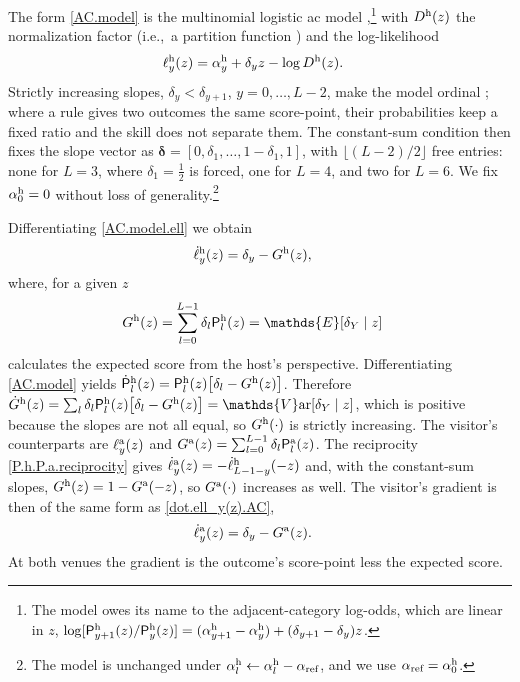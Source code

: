 \documentclass[letterpaper,12pt]{article}
\newcommand{\tr}[1]{\textrm{#1}}
\newcommand{\tnr}[1]{{\textnormal{#1}}}
\newcommand{\mf}[1]{\mathsf{#1}}
\newcommand{\ms}[1]{\mathds{#1}}
\newcommand{\bdelta}{\boldsymbol{\delta}}
\newcommand{\ie}{i.e.,~} 		%
\newcommand{\cd}{\cdot}
\newcommand{\ld}{\ldots}
\newcommand{\Ex}{\ms{E}}     			%
\newcommand{\Var}{\ms{V}\tr{ar}}     			%
\newcommand{\mfP}{\mf{P}}
\begin{document}
The form \eqref{AC.model} is the multinomial logistic \gls{ac} model \citep{Bock72,Tutz20,Egidi21,Szczecinski22},\footnote{The model owes its name to the adjacent-category log-odds, which are linear in $z$, $\log[\mfP^\tnr{h}_{y+1}(z)/\mfP^\tnr{h}_y(z)]=(\alpha^\tnr{h}_{y+1}-\alpha^\tnr{h}_y)+(\delta_{y+1}-\delta_y)z$.} with $D^\tnr{h}(z)$ the normalization factor (\ie a partition function \citep[Sec.~4.2]{Barber12_Book}) and the log-likelihood
\begin{align}
\label{AC.model.ell}
\ell^\tnr{h}_{y}(z)&= \alpha^\tnr{h}_y + \delta_y z -\log D^\tnr{h}(z).
\end{align}
Strictly increasing slopes, $\delta_y<\delta_{y+1}$, $y=0,\ld,L-2$, make the model ordinal \citep{Tutz19}; where a rule gives two outcomes the same score-point, their probabilities keep a fixed ratio and the skill does not separate them. The constant-sum condition then fixes the slope vector as $\bdelta=[0,\delta_1,\ld,1-\delta_1,1]$, with $\lfloor(L-2)/2\rfloor$ free entries: none for $L=3$, where $\delta_1=\tfrac12$ is forced, one for $L=4$, and two for $L=6$. We fix $\alpha^\tnr{h}_0=0$ without loss of generality.\footnote{The model is unchanged under $\alpha^\tnr{h}_l\leftarrow\alpha^\tnr{h}_l-\alpha_\tnr{ref}$, and we use $\alpha_\tnr{ref}=\alpha^\tnr{h}_0$.} 

Differentiating \eqref{AC.model.ell} we obtain
\begin{align}
\label{dot.ell_y(z).AC}
    \dot\ell^\tnr{h}_y(z)&=\delta_y - G^\tnr{h}(z),
\end{align}
where, for a given $z$
\begin{align}
    \label{G(z).AC}
    G^\tnr{h}(z) & =\sum_{l=0}^{L-1}\delta_l\mfP^\tnr{h}_l (z)=\Ex[\delta_Y\mid z]
\end{align}
calculates the expected score from the host's perspective. Differentiating \eqref{AC.model} yields $\dot{\mfP}^\tnr{h}_l(z)=\mfP^\tnr{h}_l(z)\bigl[\delta_l-G^\tnr{h}(z)\bigr]$. Therefore $\dot G^\tnr{h}(z)=\sum_l\delta_l\mfP^\tnr{h}_l(z)\bigl[\delta_l-G^\tnr{h}(z)\bigr]=\Var[\delta_Y\mid z]$, which is positive because the slopes are not all equal, so $G^\tnr{h}(\cd)$ is strictly increasing. The visitor's counterparts are $\ell^\tnr{a}_y(z)$ and $G^\tnr{a}(z)=\sum_{l=0}^{L-1}\delta_l\mfP^\tnr{a}_l(z)$. The reciprocity \eqref{P.h.P.a.reciprocity} gives $\dot\ell^\tnr{a}_y(z)=-\dot\ell^\tnr{h}_{L-1-y}(-z)$ and, with the constant-sum slopes, $G^\tnr{h}(z)=1-G^\tnr{a}(-z)$, so $G^\tnr{a}(\cd)$ increases as well. The visitor's gradient is then of the same form as \eqref{dot.ell_y(z).AC},
\begin{align}
    \label{dot.ell_y(z).AC.a}
    \dot\ell^\tnr{a}_y(z)&=\delta_y - G^\tnr{a}(z).
\end{align}
At both venues the gradient is the outcome's score-point less the expected score.
\end{document}
